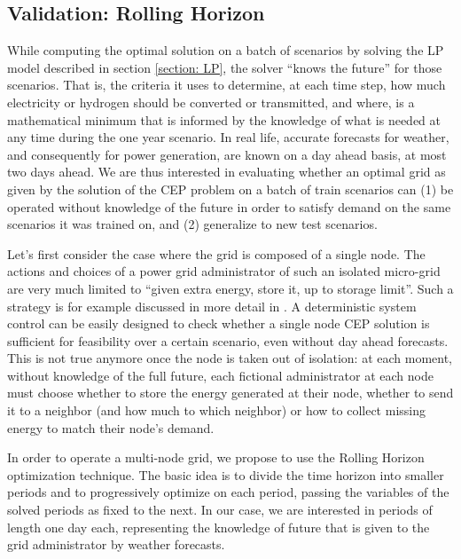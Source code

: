 \subsection{Validation: Rolling Horizon}\label{subsection: RH}

While computing the optimal solution on a batch of scenarios by solving the LP model described in section \ref{section: LP}, the solver ``knows the future'' for those scenarios. 
That is, the criteria it uses to determine, at each time step, how much electricity or hydrogen should be converted or transmitted, and where, is a mathematical minimum that is informed by the knowledge of what is needed at any time during the one year scenario.
In real life, accurate forecasts for weather, and consequently for power generation, are known on a day ahead basis, at most two days ahead. 
We are thus interested in evaluating whether an optimal grid as given by the solution of the CEP problem on a batch of train scenarios can (1) be operated without knowledge of the future in order to satisfy demand on the same scenarios it was trained on, and (2) generalize to new test scenarios.

Let's first consider the case where the grid is composed of a single node. 
The actions and choices of a power grid administrator of such an isolated micro-grid are very much limited to ``given extra energy, store it, up to storage limit''. 
Such a strategy is for example discussed in more detail in \textcolor{green}{\cite{deterministic}}. 
A deterministic system control can be easily designed to check whether a single node CEP solution is sufficient for feasibility over a certain scenario, even without day ahead forecasts.
This is not true anymore once the node is taken out of isolation: at each moment, without knowledge of the full future, each fictional administrator at each node must choose whether to store the energy generated at their node, whether to send it to a neighbor (and how much to which neighbor) or how to collect missing energy to match their node's demand.

In order to operate a multi-node grid, we propose to use the Rolling Horizon optimization technique. 
The basic idea is to divide the time horizon into smaller periods and to progressively optimize on each period, passing the variables of the solved periods as fixed to the next. 
In our case, we are interested in periods of length one day each, representing the knowledge of future that is given to the grid administrator by weather forecasts.

